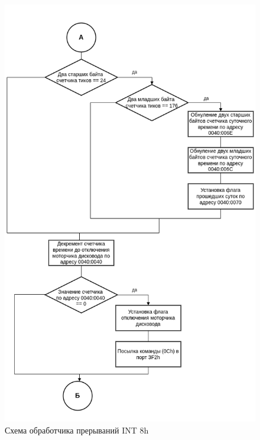 \begin{figure}[h!]
	\begin{center}
		\includegraphics[scale=0.6]{img/int8h_2}
	\end{center}
	\captionsetup{justification=centering}
	\caption{Схема обработчика прерываний INT 8h}
	\label{img:s1}
\end{figure}

